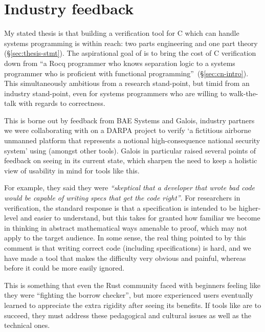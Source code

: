 \section{Industry feedback}\label{sec:industry-feedback}

My stated thesis is that building a verification tool for C which can handle
 systems programming is within reach: two parts engineering and one
part theory (\S\ref{sec:thesis-stmt}). The aspirational goal of  is to
bring the cost of C verification down from ``a Rocq programmer who knows
separation logic to a systems programmer who is proficient with functional
programming''~(\S\ref{sec:cn-intro}). This simultaneously ambitious from a
research stand-point, but timid from an industry stand-point, even for systems
programmers who are willing to walk-the-talk with regards to correctness.

This is borne out by feedback from BAE Systems and Galois, industry partners
we were collaborating with on a DARPA project to verify `a fictitious airborne
unmanned platform that represents a notional high-consequence national security
system' using  (amongst other
tools). Galois in
particular raised several points of feedback on seeing  in its current
state, which sharpen the need to keep a holistic view of usability in mind for
tools like this.

For example, they said they were \emph{``skeptical that a developer that wrote
bad code would be capable of writing specs that get the code right''}. For
researchers in verification, the standard response is that a specification is
intended to be higher-level and easier to understand, but this takes for
granted how familiar we become in thinking in abstract mathematical ways
amenable to proof, which may not apply to the target audience. In some sense,
the real thing pointed to by this comment is that writing correct code
(including specifications) is hard, and we have made a tool that makes the
difficulty very obvious and painful, whereas before it could be more easily
ignored.

This is something that even the Rust community faced with beginners feeling
like they were ``fighting the borrow checker'', but more experienced users
eventually learned to appreciate the extra rigidity after seeing its benefits.
If tools like  are to succeed, they must address these pedagogical and
cultural issues as well as the technical ones.

